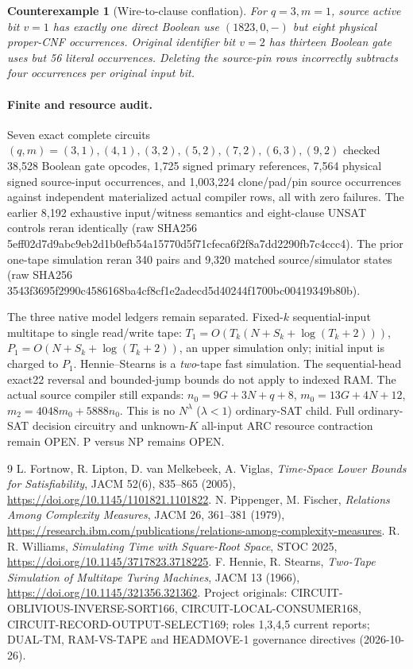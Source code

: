 \documentclass[11pt]{article}
\newtheorem{counterexample}[theorem]{Counterexample}
\begin{document}
\begin{counterexample}[Wire-to-clause conflation]
For $q=3,m=1$, source active bit $v=1$ has exactly one
direct Boolean use $(1823,0,-)$ but eight physical
proper-CNF occurrences. Original identifier bit $v=2$
has thirteen Boolean gate uses but 56 literal occurrences.
Deleting the source-pin rows incorrectly subtracts
four occurrences per original input bit.
\end{counterexample}

\paragraph{Finite and resource audit.}
Seven exact complete circuits $(q,m)=(3,1),(4,1),(3,2),
(5,2),(7,2),(6,3),(9,2)$ checked 38,528 Boolean gate
opcodes, 1,725 signed primary references, 7,564
physical signed source-input occurrences, and 1,003,224
clone/pad/pin source occurrences against independent
materialized actual compiler rows, all with zero failures.
The earlier 8,192 exhaustive input/witness semantics and
eight-clause UNSAT controls reran identically
(raw SHA256 5eff02d7d9abc9eb2d1b0efb54a15770d5f71cfeca6f2f8a7dd2290fb7c4ccc4).
The prior one-tape simulation reran 340 pairs and 9,320
matched source/simulator states (raw SHA256
3543f3695f2990c4586168ba4cf8cf1e2adecd5d40244f1700bc00419349b80b).

The three native model ledgers remain separated. Fixed-$k$
sequential-input multitape to single read/write tape:
$T_1=O(T_k(N+S_k+\log(T_k+2)))$,
$P_1=O(N+S_k+\log(T_k+2))$, an upper
simulation only; initial input is charged to $P_1$.
Hennie--Stearns is a \emph{two}-tape fast simulation.
The sequential-head exact22 reversal and bounded-jump
bounds do not apply to indexed RAM. The actual source
compiler still expands:
$n_0=9G+3N+q+8$, $m_0=13G+4N+12$,
$m_2=4048m_0+5888n_0$. This is no $N^\lambda$
($\lambda<1$) ordinary-SAT child. Full ordinary-SAT
decision circuitry and unknown-$K$ all-input ARC
resource contraction remain OPEN. P versus NP remains OPEN.

\begin{thebibliography}{9}
 L. Fortnow, R. Lipton, D. van Melkebeek, A. Viglas,
\emph{Time-Space Lower Bounds for Satisfiability},
JACM 52(6), 835--865 (2005),
\url{https://doi.org/10.1145/1101821.1101822}.
 N. Pippenger, M. Fischer,
\emph{Relations Among Complexity Measures}, JACM 26, 361--381
(1979), \url{https://research.ibm.com/publications/relations-among-complexity-measures}.
 R. R. Williams,
\emph{Simulating Time with Square-Root Space}, STOC 2025,
\url{https://doi.org/10.1145/3717823.3718225}.
 F. Hennie, R. Stearns,
\emph{Two-Tape Simulation of Multitape Turing Machines},
JACM 13 (1966), \url{https://doi.org/10.1145/321356.321362}.
 Project originals: CIRCUIT-OBLIVIOUS-INVERSE-SORT166,
CIRCUIT-LOCAL-CONSUMER168, CIRCUIT-RECORD-OUTPUT-SELECT169;
roles 1,3,4,5 current reports; DUAL-TM, RAM-VS-TAPE and
HEADMOVE-1 governance directives (2026-10-26).
\end{thebibliography}
\end{document}
